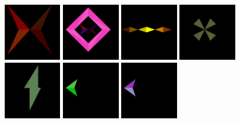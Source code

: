 \thispagestyle{empty}%
\clearpage
\vspace*{\fill}
\begin{figure}[H]
  \centering
\includegraphics[width=2.5cm]{preface/obj2d/obj_0.png}
\includegraphics[width=2.5cm]{preface/obj2d/obj_1.png}
\includegraphics[width=2.5cm]{preface/obj2d/obj_10.png}
\includegraphics[width=2.5cm]{preface/obj2d/obj_13.png}
\includegraphics[width=2.5cm]{preface/obj2d/obj_14.png}
\includegraphics[width=2.5cm]{preface/obj2d/obj_15.png}
\includegraphics[width=2.5cm]{preface/obj2d/obj_16.png}

\end{figure}
